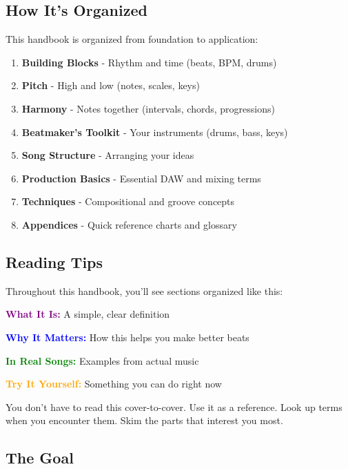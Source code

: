 \documentclass[11pt,letterpaper]{article}
\newcommand{\purple}[1]{\textcolor{purple}{\textbf{#1}}}
\newcommand{\bluepurple}[1]{\textcolor{blue}{\textbf{#1}}}
\newcommand{\greentext}[1]{\textcolor{green}{\textbf{#1}}}
\newcommand{\orangetext}[1]{\textcolor{orange}{\textbf{#1}}}
\begin{document}
\subsection*{How It's Organized}

This handbook is organized from foundation to application:

\begin{enumerate}[leftmargin=*]
\item \textbf{Building Blocks} - Rhythm and time (beats, BPM, drums)
\item \textbf{Pitch} - High and low (notes, scales, keys)
\item \textbf{Harmony} - Notes together (intervals, chords, progressions)
\item \textbf{Beatmaker's Toolkit} - Your instruments (drums, bass, keys)
\item \textbf{Song Structure} - Arranging your ideas
\item \textbf{Production Basics} - Essential DAW and mixing terms
\item \textbf{Techniques} - Compositional and groove concepts
\item \textbf{Appendices} - Quick reference charts and glossary
\end{enumerate}

\subsection*{Reading Tips}

\begin{tcolorbox}[colback=blue!5,colframe=blue,width=\textwidth,arc=3mm,boxrule=1pt]
Throughout this handbook, you'll see sections organized like this:

\textbf{\purple{What It Is:}} A simple, clear definition

\textbf{\bluepurple{Why It Matters:}} How this helps you make better beats

\textbf{\greentext{In Real Songs:}} Examples from actual music

\textbf{\orangetext{Try It Yourself:}} Something you can do right now
\end{tcolorbox}

You don't have to read this cover-to-cover. Use it as a reference. Look up terms when you encounter them. Skim the parts that interest you most.

\subsection*{The Goal}
\end{document}
